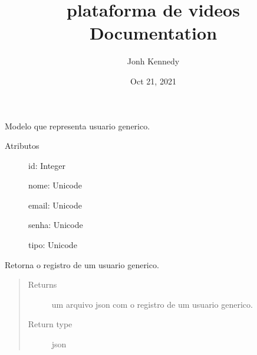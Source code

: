 \documentclass[letterpaper,10pt,english]{sphinxmanual}
\title{plataforma de videos Documentation}
\date{Oct 21, 2021}
\author{Jonh Kennedy}
\begin{document}
\pagestyle{empty}
\sphinxmaketitle
\pagestyle{plain}
\sphinxtableofcontents
\pagestyle{normal}
\label{\detokenize{index::doc}}


\begin{fulllineitems}
\label{\detokenize{index:usuario.Usuario}}
Modelo que representa usuario generico.
\begin{description}
\item[{Atributos}] \leavevmode
id: Integer

nome: Unicode

email: Unicode

senha: Unicode

tipo: Unicode

\end{description}

\end{fulllineitems}


\begin{fulllineitems}
\label{\detokenize{index:usuario.get_usuario}}
Retorna o registro de um usuario
generico.
\begin{quote}\begin{description}
\item[{Returns}] \leavevmode
um arquivo json com o registro de um usuario generico.

\item[{Return type}] \leavevmode
json

\end{description}\end{quote}

\end{fulllineitems}

\label{\detokenize{index:module-aprendiz}}
\end{document}
